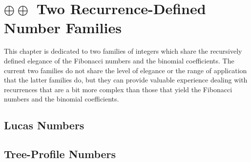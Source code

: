 
\chapter{$\oplus \oplus$ Two Recurrence-Defined Number Families}
\label{ch:recurrent-numbers-appendix}


\noindent {}

\bigskip

\noindent
This chapter is dedicated to two families of integers which share the recursively defined elegance of the Fibonacci numbers and the binomial coefficients.  The current two families do not share the level of elegance or the range of application that the latter families do, but they can provide valuable experience dealing with recurrences that are a bit more complex than those that yield the Fibonacci numbers and the binomial coefficients.


\section{Lucas Numbers}
\label{sec:Lucas-numbers}




\section{Tree-Profile Numbers}
\label{sec:Tree-Profile-numbers}



